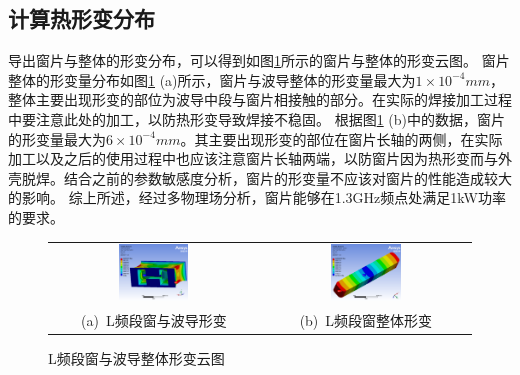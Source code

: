 \documentclass[master]{thesis-uestc}
\begin{document}
\subsection{计算热形变分布}
导出窗片与整体的形变分布，可以得到如图\ref{fig:L频段窗与整体形变}所示的窗片与整体的形变云图。
窗片整体的形变量分布如图\ref{fig:L频段窗与整体形变} (a)所示，窗片与波导整体的形变量最大为\(1 \times 10 ^{-4}mm\)，整体主要出现形变的部位为波导中段与窗片相接触的部分。在实际的焊接加工过程中要注意此处的加工，以防热形变导致焊接不稳固。
根据图\ref{fig:L频段窗与整体形变} (b)中的数据，窗片的形变量最大为\(6 \times 10 ^{-4}mm\)。其主要出现形变的部位在窗片长轴的两侧，在实际加工以及之后的使用过程中也应该注意窗片长轴两端，以防窗片因为热形变而与外壳脱焊。结合之前的参数敏感度分析，窗片的形变量不应该对窗片的性能造成较大的影响。
综上所述，经过多物理场分析，窗片能够在1.3GHz频点处满足1kW功率的要求。
\begin{figure}[!htb]
    \small
    \centering
    \begin{tabular}{@{\ }c@{\ }c}
        \includegraphics[width=0.35\textwidth]{pic/chapter4/L频段整体形变.png} & 
        \hspace{5pt}
        \includegraphics[width=0.35\textwidth]{pic/chapter4/L频段窗形变.png}     \\
        \mbox{\small (a) L频段窗与波导形变}                                                                               & 
        \mbox{\small (b) L频段窗整体形变}                                                                                  \\
    \end{tabular}
    \caption{L频段窗与波导整体形变云图}
    \label{fig:L频段窗与整体形变}
\end{figure}
\end{document}
